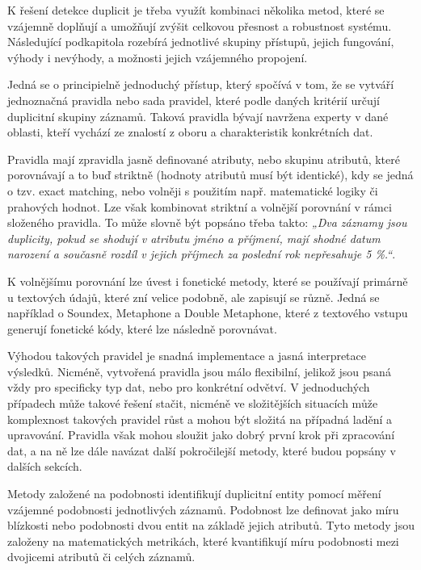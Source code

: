 K řešení detekce duplicit je třeba využít kombinaci několika metod, které se vzájemně doplňují a umožňují zvýšit celkovou přesnost a robustnost systému. Následující podkapitola rozebírá jednotlivé skupiny přístupů, jejich fungování, výhody i nevýhody, a možnosti jejich vzájemného propojení.


Jedná se o principielně jednoduchý přístup, který spočívá v tom, že se vytváří jednoznačná pravidla nebo sada pravidel, které podle daných kritérií určují duplicitní skupiny záznamů. Taková pravidla bývají navržena experty v dané oblasti, kteří vychází ze znalostí z oboru a charakteristik konkrétních dat.

Pravidla mají zpravidla jasně definované atributy, nebo skupinu atributů, které porovnávají a to buď striktně (hodnoty atributů musí být identické), kdy se jedná o tzv. exact matching, nebo volněji s použitím např. matematické logiky či prahových hodnot. Lze však kombinovat striktní a volnější porovnání v rámci složeného pravidla. To může slovně být popsáno třeba takto: \textit{„Dva záznamy jsou duplicity, pokud se shodují v atributu jméno a příjmení, mají shodné datum narození a současně rozdíl v jejich příjmech za poslední rok nepřesahuje 5 \%.“}.

K volnějšímu porovnání lze úvest i fonetické metody, které se používají primárně u textových údajů, které zní velice podobně, ale zapisují se různě. Jedná se například o Soundex, Metaphone a Double Metaphone, které z textového vstupu generují fonetické kódy, které lze následně porovnávat.

Výhodou takových pravidel je snadná implementace a jasná interpretace výsledků. Nicméně, vytvořená pravidla jsou málo flexibilní, jelikož jsou psaná vždy pro specificky typ dat, nebo pro konkrétní odvětví. V jednoduchých případech může takové řešení stačit, nicméně ve složitějších situacích může komplexnost takových pravidel růst a mohou být složitá na případná ladění a upravování. Pravidla však mohou sloužit jako dobrý první krok při zpracování dat, a na ně lze dále navázat další pokročilejší metody, které budou popsány v dalších sekcích.


Metody založené na podobnosti identifikují duplicitní entity pomocí měření vzájemné podobnosti jednotlivých záznamů. Podobnost lze definovat jako míru blízkosti nebo podobnosti dvou entit na základě jejich atributů. Tyto metody jsou založeny na matematických metrikách, které kvantifikují míru podobnosti mezi dvojicemi atributů či celých záznamů.

